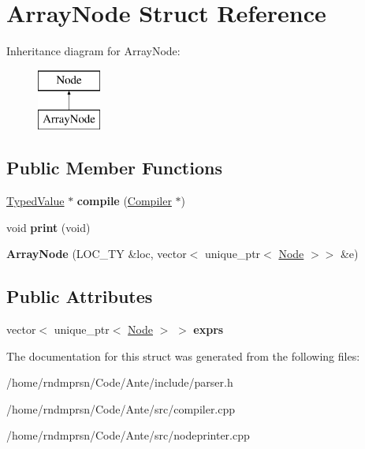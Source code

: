 \hypertarget{structArrayNode}{}\section{Array\+Node Struct Reference}
\label{structArrayNode}
Inheritance diagram for Array\+Node\+:\begin{figure}[H]
\begin{center}
\leavevmode
\includegraphics[height=2.000000cm]{structArrayNode}
\end{center}
\end{figure}
\subsection*{Public Member Functions}
\begin{DoxyCompactItemize}
\item 
\mbox{\label{structArrayNode_ac290e70b1643eb8bdd0d4d0776f647b7}} 
\hyperlink{structTypedValue}{Typed\+Value} $\ast$ {\bfseries compile} (\hyperlink{structante_1_1Compiler}{Compiler} $\ast$)
\item 
\mbox{\label{structArrayNode_a0a508139a5fc3a92a19b51fd1823febd}} 
void {\bfseries print} (void)
\item 
\mbox{\label{structArrayNode_ac6de6d7a61309a1ca9aa3265a08757a6}} 
{\bfseries Array\+Node} (L\+O\+C\+\_\+\+TY \&loc, vector$<$ unique\+\_\+ptr$<$ \hyperlink{structNode}{Node} $>$$>$ \&e)
\end{DoxyCompactItemize}
\subsection*{Public Attributes}
\begin{DoxyCompactItemize}
\item 
\mbox{\label{structArrayNode_a26496de96bd63fee1c0e14184c8f6f71}} 
vector$<$ unique\+\_\+ptr$<$ \hyperlink{structNode}{Node} $>$ $>$ {\bfseries exprs}
\end{DoxyCompactItemize}


The documentation for this struct was generated from the following files\+:\begin{DoxyCompactItemize}
\item 
/home/rndmprsn/\+Code/\+Ante/include/parser.\+h\item 
/home/rndmprsn/\+Code/\+Ante/src/compiler.\+cpp\item 
/home/rndmprsn/\+Code/\+Ante/src/nodeprinter.\+cpp\end{DoxyCompactItemize}
